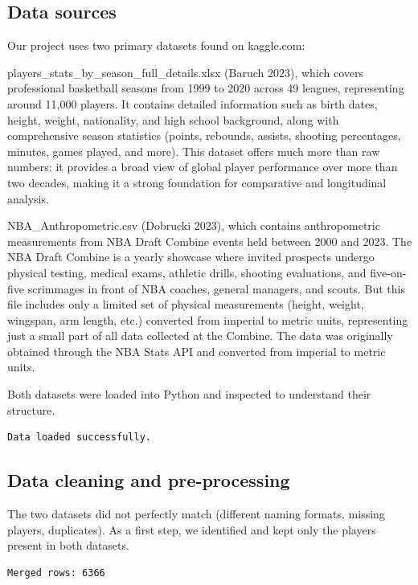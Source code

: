 \documentclass[
  letterpaper,
  DIV=11,
  numbers=noendperiod]{scrartcl}
\begin{document}
\subsection{Data sources}\label{data-sources}

Our project uses two primary datasets found on kaggle.com:

players\_stats\_by\_season\_full\_details.xlsx (Baruch 2023), which
covers professional basketball seasons from 1999 to 2020 across 49
leagues, representing around 11,000 players. It contains detailed
information such as birth dates, height, weight, nationality, and high
school background, along with comprehensive season statistics (points,
rebounds, assists, shooting percentages, minutes, games played, and
more). This dataset offers much more than raw numbers: it provides a
broad view of global player performance over more than two decades,
making it a strong foundation for comparative and longitudinal analysis.

NBA\_Anthropometric.csv (Dobrucki 2023), which contains anthropometric
measurements from NBA Draft Combine events held between 2000 and 2023.
The NBA Draft Combine is a yearly showcase where invited prospects
undergo physical testing, medical exams, athletic drills, shooting
evaluations, and five-on-five scrimmages in front of NBA coaches,
general managers, and scouts. But this file includes only a limited set
of physical measurements (height, weight, wingspan, arm length, etc.)
converted from imperial to metric units, representing just a small part
of all data collected at the Combine. The data was originally obtained
through the NBA Stats API and converted from imperial to metric units.

Both datasets were loaded into Python and inspected to understand their
structure.

\label{setup}
\begin{verbatim}
Data loaded successfully.
\end{verbatim}

\subsection{Data cleaning and
pre-processing}\label{data-cleaning-and-pre-processing}

The two datasets did not perfectly match (different naming formats,
missing players, duplicates). As a first step, we identified and kept
only the players present in both datasets.

\label{merging-data}
\begin{verbatim}
Merged rows: 6366
\end{verbatim}
\end{document}
